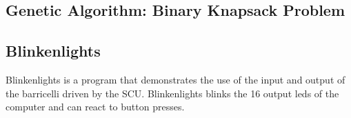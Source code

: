 \subsection{Genetic Algorithm: Binary Knapsack Problem}


\subsection{Blinkenlights}

Blinkenlights is a program that demonstrates the use of the input and output of the \Gls{barricelli} driven by the \Gls{SCU}.
Blinkenlights blinks the 16 output leds of the computer and can react to button presses.

